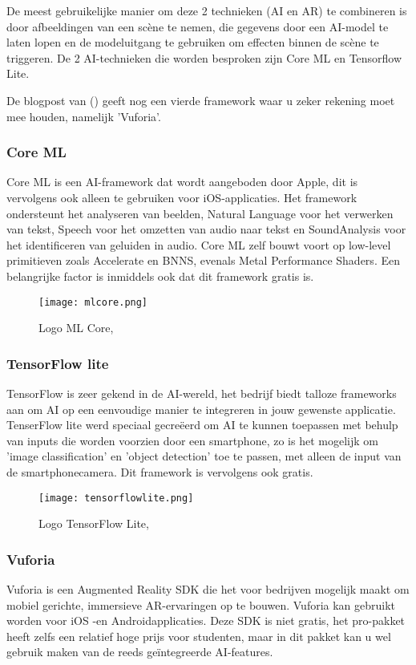De meest gebruikelijke manier om deze 2 technieken (AI en AR) te combineren is door afbeeldingen van een scène te nemen, die gegevens door een AI-model te laten lopen en de modeluitgang te gebruiken om effecten binnen de scène te triggeren. De 2 AI-technieken die worden besproken zijn Core ML en Tensorflow Lite.

De blogpost van \autocite{Girish2020} () geeft nog een vierde framework waar u zeker rekening moet mee houden, namelijk 'Vuforia'.

\subsubsection{Core ML}
Core ML is een AI-framework dat wordt aangeboden door Apple, dit is vervolgens ook alleen te gebruiken voor iOS-applicaties. Het framework ondersteunt het analyseren van beelden, Natural Language voor het verwerken van tekst, Speech voor het omzetten van audio naar tekst en SoundAnalysis voor het identificeren van geluiden in audio. Core ML zelf bouwt voort op low-level primitieven zoals Accelerate en BNNS, evenals Metal Performance Shaders. Een  belangrijke factor is inmiddels ook dat dit framework gratis is. \autocite{AppleML2020}


\begin{figure}[H]
	\centering
	\texttt{[image: mlcore.png]}
	\caption{Logo ML Core, \autocite{AppleML2020}}
\end{figure}

\subsubsection{TensorFlow lite}
TensorFlow is zeer gekend in de AI-wereld, het bedrijf biedt talloze frameworks aan om AI op een eenvoudige manier te integreren in jouw gewenste applicatie. TenserFlow lite werd speciaal gecreëerd om AI te kunnen toepassen met behulp van inputs die worden voorzien door een smartphone, zo is het mogelijk om 'image classification' en 'object detection' toe te passen, met alleen de input van de smartphonecamera. Dit framework is vervolgens ook gratis. \autocite{TensorFlowLite2020}

\begin{figure}[H]
	\centering
	\texttt{[image: tensorflowlite.png]}
	\caption{Logo TensorFlow Lite, \autocite{TensorFlowLite2020}}
\end{figure}

\subsubsection{Vuforia}
Vuforia is een Augmented Reality SDK die het voor bedrijven mogelijk maakt om mobiel gerichte, immersieve AR-ervaringen op te bouwen. Vuforia kan gebruikt worden voor iOS -en Androidapplicaties. Deze SDK is niet gratis, het pro-pakket heeft zelfs een relatief hoge prijs voor studenten, maar in dit pakket kan u wel gebruik maken van de reeds geïntegreerde AI-features. \autocite{Girish2020}

